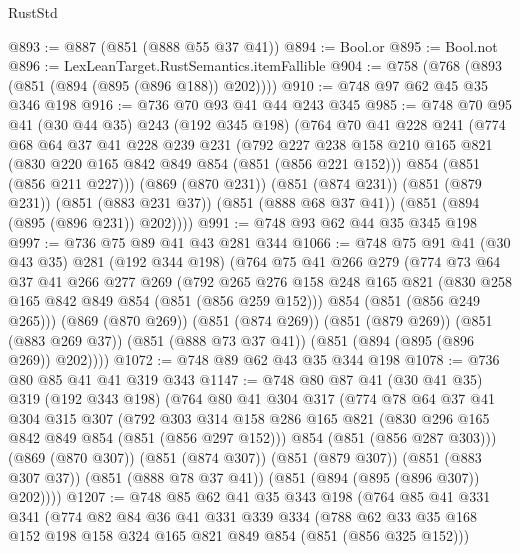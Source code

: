 \begin{lexlean}{RustStd}
\begin{coremodule}
@893 := @887 (@851 (@888 @55 @37 @41))
@894 := Bool.or
@895 := Bool.not
@896 := LexLeanTarget.RustSemantics.itemFallible
@904 := @758 (@768 (@893 (@851 (@894 (@895 (@896 @188)) @202))))
@910 := @748 @97 @62 @45 @35 @346 @198
@916 := @736 @70 @93 @41 @44 @243 @345
@985 := @748
    @70
    @95
    @41
    (@30 @44 @35)
    @243
    (@192 @345 @198)
    (@764
      @70
      @41
      @228
      @241
      (@774
        @68
        @64
        @37
        @41
        @228
        @239
        @231
        (@792
          @227
          @238
          @158
          @210
          @165
          @821
          (@830 @220 @165 @842 @849 @854 (@851 (@856 @221 @152)))
          @854
          (@851 (@856 @211 @227)))
        (@869 (@870 @231))
        (@851 (@874 @231))
        (@851 (@879 @231))
        (@851 (@883 @231 @37))
        (@851 (@888 @68 @37 @41))
        (@851 (@894 (@895 (@896 @231)) @202))))
@991 := @748 @93 @62 @44 @35 @345 @198
@997 := @736 @75 @89 @41 @43 @281 @344
@1066 := @748
    @75
    @91
    @41
    (@30 @43 @35)
    @281
    (@192 @344 @198)
    (@764
      @75
      @41
      @266
      @279
      (@774
        @73
        @64
        @37
        @41
        @266
        @277
        @269
        (@792
          @265
          @276
          @158
          @248
          @165
          @821
          (@830 @258 @165 @842 @849 @854 (@851 (@856 @259 @152)))
          @854
          (@851 (@856 @249 @265)))
        (@869 (@870 @269))
        (@851 (@874 @269))
        (@851 (@879 @269))
        (@851 (@883 @269 @37))
        (@851 (@888 @73 @37 @41))
        (@851 (@894 (@895 (@896 @269)) @202))))
@1072 := @748 @89 @62 @43 @35 @344 @198
@1078 := @736 @80 @85 @41 @41 @319 @343
@1147 := @748
    @80
    @87
    @41
    (@30 @41 @35)
    @319
    (@192 @343 @198)
    (@764
      @80
      @41
      @304
      @317
      (@774
        @78
        @64
        @37
        @41
        @304
        @315
        @307
        (@792
          @303
          @314
          @158
          @286
          @165
          @821
          (@830 @296 @165 @842 @849 @854 (@851 (@856 @297 @152)))
          @854
          (@851 (@856 @287 @303)))
        (@869 (@870 @307))
        (@851 (@874 @307))
        (@851 (@879 @307))
        (@851 (@883 @307 @37))
        (@851 (@888 @78 @37 @41))
        (@851 (@894 (@895 (@896 @307)) @202))))
@1207 := @748
    @85
    @62
    @41
    @35
    @343
    @198
    (@764
      @85
      @41
      @331
      @341
      (@774
        @82
        @84
        @36
        @41
        @331
        @339
        @334
        (@788 @62 @33 @35 @168 @152 @198 @158 @324 @165 @821 @849 @854 (@851 (@856 @325 @152)))

\end{coremodule}
\end{lexlean}
